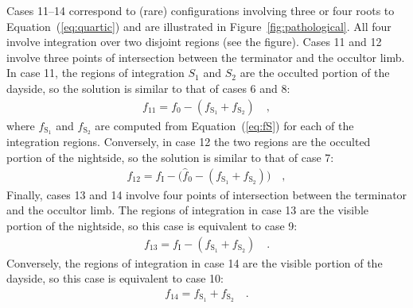 \documentclass[modern]{aastex62}
\begin{document}
Cases 11--14 correspond to (rare) configurations involving three
or four roots to Equation~(\ref{eq:quartic}) and are
illustrated in Figure~\ref{fig:pathological}. All four involve integration over
two disjoint regions (see the figure).
%
Cases 11 and 12 involve three points of intersection between the terminator
and the occultor limb. In case 11, the regions of integration $S_1$ and
$S_2$ are the
occulted portion of the dayside, so the solution is similar to
that of cases 6 and 8:
%
\begin{align}
    \label{eq:f11}
    f_{11} = f_0 - (f_{\mathrm{S}_1} + f_{\mathrm{S}_2})
    \quad,
\end{align}
%
where $f_{\mathrm{S}_1}$ and $f_{\mathrm{S}_2}$ are computed from Equation~(\ref{eq:fS}) for
each of the integration regions. Conversely, in case 12 the two regions
are the occulted portion of the nightside, so the solution is similar to that
of case 7:
%
\begin{align}
    \label{eq:f12}
    f_{12} = f_\mathrm{I} - \big(\hat{f}_0 - (f_{\mathrm{S}_1} + f_{\mathrm{S}_2})\big)
    \quad,
\end{align}
%
Finally, cases 13 and 14 involve four points of intersection between the
terminator and the occultor limb. The regions of integration in case 13 are
the visible portion of the nightside, so this case is equivalent to case 9:
%
\begin{align}
    \label{eq:f13}
    f_{13} = f_\mathrm{I} - (f_{\mathrm{S}_1} + f_{\mathrm{S}_2})
    \quad.
\end{align}
%
Conversely, the regions of integration in case 14 are the
visible portion of the dayside, so this case is equivalent to case 10:
%
\begin{align}
    \label{eq:f14}
    f_{14} = f_{\mathrm{S}_1} + f_{\mathrm{S}_2}
    \quad.
\end{align}
%
\end{document}
